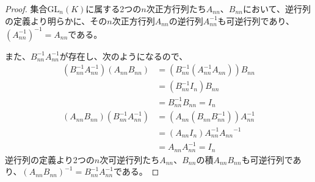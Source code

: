 \documentclass[dvipdfmx]{jsarticle}
\begin{document}
\begin{proof}
集合${\mathrm{GL}}_{n}(K)$に属する2つの$n$次正方行列たち$A_{nn}$、$B_{nn}$において、逆行列の定義より明らかに、その$n$次正方行列$A_{nn}$の逆行列$A_{nn}^{- 1}$も可逆行列であり、$\left( A_{nn}^{- 1} \right)^{- 1} = A_{nn}$である。\par
また、$B_{nn}^{- 1}A_{nn}^{- 1}$が存在し、次のようになるので、
\begin{align*}
\left( B_{nn}^{- 1}A_{nn}^{- 1} \right)\left( A_{nn}B_{nn} \right) &= \left( B_{nn}^{- 1}\left( A_{nn}^{- 1}A_{nn} \right) \right)B_{nn}\\
&= \left( B_{nn}^{- 1}I_{n} \right)B_{nn}\\
&= B_{nn}^{- 1}B_{nn} = I_{n}\\
\left( A_{nn}B_{nn} \right)\left( B_{nn}^{- 1}A_{nn}^{- 1} \right) &= \left( A_{nn}\left( B_{nn}B_{nn}^{- 1} \right) \right)A_{nn}^{- 1}\\
&= \left( A_{nn}I_{n} \right)A_{nn}^{- 1}{A_{nn}}^{- 1}\\
&= A_{nn}A_{nn}^{- 1} = I_{n}
\end{align*}
逆行列の定義より2つの$n$次可逆行列たち$A_{nn}$、$B_{nn}$の積$A_{nn}B_{nn}$も可逆行列であり、$\left( A_{nn}B_{nn} \right)^{- 1} = B_{nn}^{- 1}A_{nn}^{- 1}$である。
\end{proof}
\end{document}
